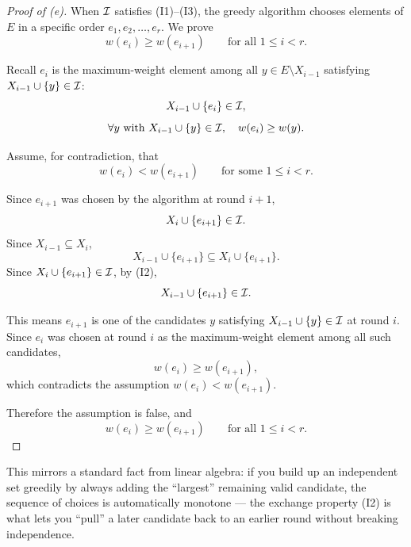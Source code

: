 \documentclass[11pt]{article}
\begin{document}
\begin{solution}[(e)]
\begin{proof}[Proof of (e)]
    When $\mathcal{I}$ satisfies (I1)--(I3), the greedy algorithm chooses
    elements of $E$ in a specific order $e_1,e_2,\dots,e_r$. We prove
    \[
        w(e_i) \ge w(e_{i+1}) \qquad \text{for all } 1\le i<r.
    \]

    Recall $e_i$ is the maximum-weight element among all
    $y\in E\setminus X_{i-1}$ satisfying $X_{i-1}\cup\{y\}\in\mathcal{I}$:
    \[
        X_{i-1}\cup\{e_i\}\in\mathcal{I},
    \]
    \[
        \forall y \text{ with } X_{i-1}\cup\{y\}\in\mathcal{I},\quad
        w(e_i)\ge w(y).
    \]

    Assume, for contradiction, that
    \[
        w(e_i) < w(e_{i+1}) \qquad \text{for some } 1\le i<r.
    \]

    Since $e_{i+1}$ was chosen by the algorithm at round $i+1$,
    \[
        X_i \cup \{e_{i+1}\} \in \mathcal{I}.
    \]
    Since $X_{i-1}\subseteq X_i$,
    \[
        X_{i-1}\cup\{e_{i+1}\} \subseteq X_i\cup\{e_{i+1}\}.
    \]
    Since $X_i\cup\{e_{i+1}\}\in\mathcal{I}$, by (I2),
    \[
        X_{i-1}\cup\{e_{i+1}\}\in\mathcal{I}.
    \]

    This means $e_{i+1}$ is one of the candidates $y$ satisfying
    $X_{i-1}\cup\{y\}\in\mathcal{I}$ at round $i$. Since $e_i$ was chosen at
    round $i$ as the maximum-weight element among all such
    candidates,
    \[
        w(e_i) \ge w(e_{i+1}),
    \]
    which contradicts the assumption $w(e_i) < w(e_{i+1})$.

    Therefore the assumption is false, and
    \[
        w(e_i)\ge w(e_{i+1}) \qquad \text{for all } 1\le i<r.
    \]
\end{proof}

\begin{remark}
    This mirrors a standard fact from linear algebra: if you build up
    an independent set greedily by always adding the ``largest''
    remaining valid candidate, the sequence of choices is
    automatically monotone --- the exchange property (I2) is what
    lets you ``pull'' a later candidate back to an earlier round
    without breaking independence.
\end{remark}
\end{solution}
\end{document}
